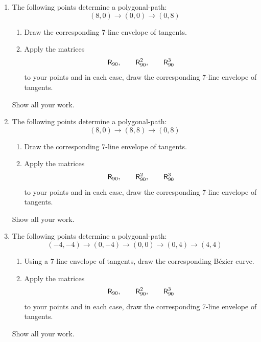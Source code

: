 \begin{enumerate}
\item The following points determine a polygonal-path:
\[
(8,0)\to (0,0)\to (0,8)
\]
\begin{enumerate}
\item Draw the corresponding 7-line envelope of tangents. 
\item Apply the matrices
\[
\mathsf{R}_{90}, \qquad \mathsf{R}_{90}^2, \qquad \mathsf{R}_{90}^3
\]
to your points and in each case, draw the corresponding 7-line
envelope of tangents. 
\end{enumerate}
Show all your work.

\item The following points determine a polygonal-path:
\[
(8,0)\to (8,8)\to (0,8)
\]
\begin{enumerate}
\item Draw the corresponding 7-line envelope of tangents. 
\item Apply the matrices
\[
\mathsf{R}_{90}, \qquad \mathsf{R}_{90}^2, \qquad \mathsf{R}_{90}^3
\]
to your points and in each case, draw the corresponding 7-line
envelope of tangents. 
\end{enumerate}
Show all your work.

\item The following points determine a polygonal-path:
\[
(-4,-4) \to (0,-4)\to (0,0)\to (0,4)\to (4,4)
\]
\begin{enumerate}
\item Using a $7$-line envelope of tangents, draw the corresponding B\'ezier
curve. 
\item Apply the matrices
\[
\mathsf{R}_{90}, \qquad \mathsf{R}_{90}^2, \qquad \mathsf{R}_{90}^3
\]
to your points and in each case, draw the corresponding 7-line
envelope of tangents.
\end{enumerate}
Show all your work.

\end{enumerate}
